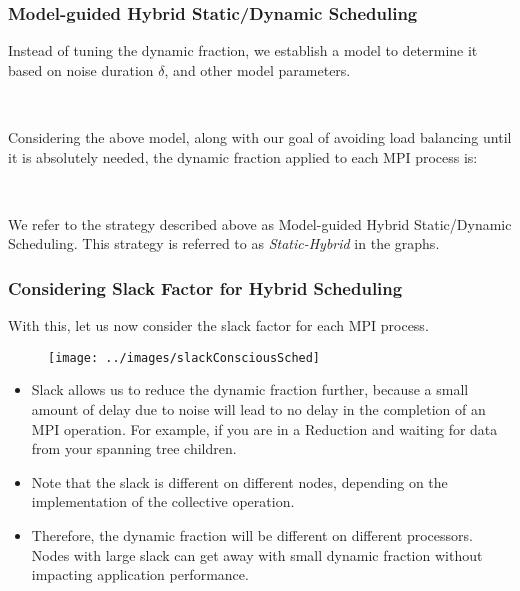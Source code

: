 \begin{frame}[label=mghybridstatdyn]
\frametitle{Model-guided Hybrid Static/Dynamic Scheduling}
{\small Instead of tuning the dynamic fraction, we establish a model to
determine it based on noise duration $\delta$, and other model parameters. \\}
\begin{center}
   \\
\end{center}

{\small Considering the above model, along with our goal of avoiding load balancing until it is absolutely needed, 
the dynamic fraction applied to each MPI process is: \\}
\begin{center}
  \\
\end{center}
    {\small We refer to the strategy described above as Model-guided Hybrid
      Static/Dynamic Scheduling. This strategy is referred to as 
      \textit{Static-Hybrid} in the graphs.} 
\end{frame}

\begin{frame}
\frametitle{Considering Slack Factor for Hybrid Scheduling}
{\small With this, let us now consider the slack factor for each MPI process.} 

\begin{figure}
  \begin{center}
    \texttt{[image: ../images/slackConsciousSched]} \\
  \end{center}
\end{figure}

\begin{itemize}
\tiny \item \tiny Slack allows us to reduce the dynamic fraction
further, because a small amount of delay due to noise will lead to no
delay in the completion of an MPI operation. For example, if you are
in a Reduction and waiting for data from your spanning tree
children. 
\item \tiny Note that the slack is different on different nodes,
  depending on the implementation of the collective operation. 
\item \tiny Therefore, the dynamic fraction will be different on
  different processors. Nodes with large slack can get away with 
small dynamic fraction without impacting application performance.
\end{itemize}
\end{frame}

